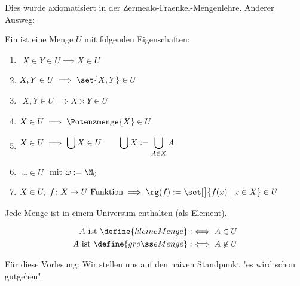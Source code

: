 Dies wurde axiomatisiert in der Zermealo-Fraenkel-Mengenlehre.\nl
Anderer Ausweg: 
\begin{definition}
	Ein  ist eine Menge $U$ mit folgenden Eigenschaften:
	\begin{enumerate}[label=(\roman*)]
		\item $\begin{aligned}
			X\in Y\in U\implies X\in U
		\end{aligned}$
		\item $\begin{aligned}
			X,Y\in U\implies\set{X,Y}\in U
		\end{aligned}$
		\item $\begin{aligned}
			X,Y\in U\implies X\times Y\in U
		\end{aligned}$
		\item $\begin{aligned}
			X\in U\implies\Potenzmenge{X}\in U
		\end{aligned}$
		\item $\begin{aligned}
			X\in U\implies \bigcup X\in U\qquad\mit \bigcup X:=\bigcup\limits_{A\in X}A
		\end{aligned}$
		\item $\begin{aligned}
			\omega\in U
		\end{aligned}$ mit $\omega:=\N_0$
		\item $\begin{aligned}
			X\in U,~f\colon X\to U\text{ Funktion}\implies\rg(f):=\set[\big]{f(x)\mid x\in X}\in U
		\end{aligned}$
	\end{enumerate}
\end{definition}

\begin{axiom}
	Jede Menge ist in einem Universum enthalten (als Element).
\end{axiom}

\begin{definition}
	\begin{align*}\index{kleine Menge}\index{große Menge}
		A\text{ ist }\define{kleine Menge} &:\iff A\in U\\
		A\text{ ist }\define{große Menge} &:\iff A\not\in U\\
	\end{align*}
\end{definition}

Für diese Vorlesung: Wir stellen uns auf den naiven Standpunkt
"es wird schon gutgehen".


